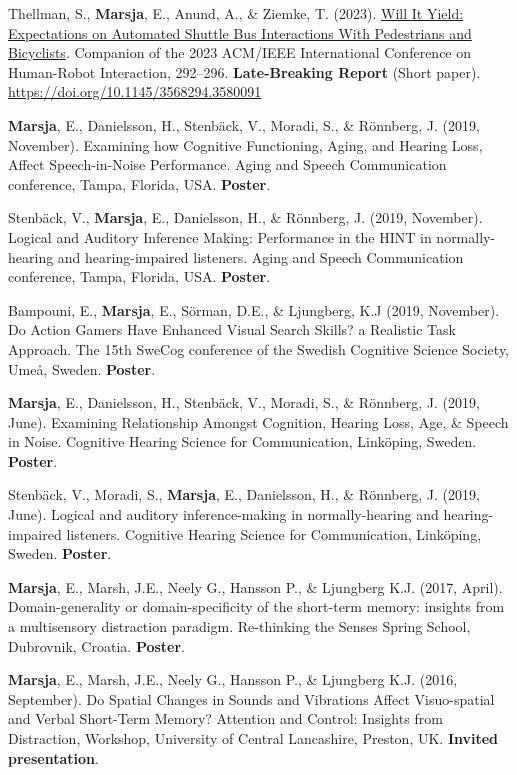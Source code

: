 \documentclass[]{article}
\begin{document}
Thellman, S., \textbf{Marsja}, E., Anund, A., \& Ziemke, T. (2023).
\href{https://dl.acm.org/doi/10.1145/3568294.3580091}{Will It Yield:
Expectations on Automated Shuttle Bus Interactions With Pedestrians and
Bicyclists}. Companion of the 2023 ACM/IEEE International Conference on
Human-Robot Interaction, 292--296. \textbf{Late-Breaking Report} (Short
paper). \url{https://doi.org/10.1145/3568294.3580091}

\textbf{Marsja}, E., Danielsson, H., Stenbäck, V., Moradi, S., \&
Rönnberg, J. (2019, November). Examining how Cognitive Functioning,
Aging, and Hearing Loss, Affect Speech-in-Noise Performance. Aging and
Speech Communication conference, Tampa, Florida, USA. \textbf{Poster}.

Stenbäck, V., \textbf{Marsja}, E., Danielsson, H., \& Rönnberg, J.
(2019, November). Logical and Auditory Inference Making: Performance in
the HINT in normally-hearing and hearing-impaired listeners. Aging and
Speech Communication conference, Tampa, Florida, USA. \textbf{Poster}.

Bampouni, E., \textbf{Marsja}, E., Sörman, D.E., \& Ljungberg, K.J
(2019, November). Do Action Gamers Have Enhanced Visual Search Skills? a
Realistic Task Approach. The 15th SweCog conference of the Swedish
Cognitive Science Society, Umeå, Sweden. \textbf{Poster}.

\textbf{Marsja}, E., Danielsson, H., Stenbäck, V., Moradi, S., \&
Rönnberg, J. (2019, June). Examining Relationship Amongst Cognition,
Hearing Loss, Age, \& Speech in Noise. Cognitive Hearing Science for
Communication, Linköping, Sweden. \textbf{Poster}.

Stenbäck, V., Moradi, S., \textbf{Marsja}, E., Danielsson, H., \&
Rönnberg, J. (2019, June). Logical and auditory inference-making in
normally-hearing and hearing-impaired listeners. Cognitive Hearing
Science for Communication, Linköping, Sweden. \textbf{Poster}.

\textbf{Marsja}, E., Marsh, J.E., Neely G., Hansson P., \& Ljungberg
K.J. (2017, April). Domain-generality or domain-specificity of the
short-term memory: insights from a multisensory distraction paradigm.
Re-thinking the Senses Spring School, Dubrovnik, Croatia.
\textbf{Poster}.

\textbf{Marsja}, E., Marsh, J.E., Neely G., Hansson P., \& Ljungberg
K.J. (2016, September). Do Spatial Changes in Sounds and Vibrations
Affect Visuo-spatial and Verbal Short-Term Memory? Attention and
Control: Insights from Distraction, Workshop, University of Central
Lancashire, Preston, UK. \textbf{Invited presentation}.
\end{document}
